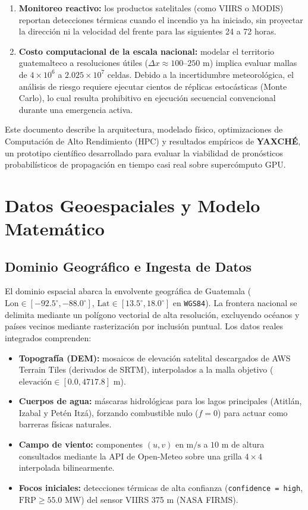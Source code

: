 \documentclass[twocolumn,10pt]{article}
\begin{document}
\begin{enumerate}
    \item \textbf{Monitoreo reactivo:} los productos satelitales (como VIIRS o MODIS) reportan detecciones térmicas cuando el incendio ya ha iniciado, sin proyectar la dirección ni la velocidad del frente para las siguientes 24 a 72 horas.
    \item \textbf{Costo computacional de la escala nacional:} modelar el territorio guatemalteco a resoluciones útiles ($\Delta x \approx 100$--$250\text{ m}$) implica evaluar mallas de $4\times 10^6$ a $2.025\times 10^7$ celdas. Debido a la incertidumbre meteorológica, el análisis de riesgo requiere ejecutar cientos de réplicas estocásticas (Monte Carlo), lo cual resulta prohibitivo en ejecución secuencial convencional durante una emergencia activa.
\end{enumerate}

Este documento describe la arquitectura, modelado físico, optimizaciones de Computación de Alto Rendimiento (HPC) y resultados empíricos de \textbf{YAXCHÉ}, un prototipo científico desarrollado para evaluar la viabilidad de pronósticos probabilísticos de propagación en tiempo casi real sobre supercómputo GPU.

\section{Datos Geoespaciales y Modelo Matemático}

\subsection{Dominio Geográfico e Ingesta de Datos}
El dominio espacial abarca la envolvente geográfica de Guatemala ($\text{Lon} \in [-92.5^\circ, -88.0^\circ]$, $\text{Lat} \in [13.5^\circ, 18.0^\circ]$ en \texttt{WGS84}). La frontera nacional se delimita mediante un polígono vectorial de alta resolución, excluyendo océanos y países vecinos mediante rasterización por inclusión puntual. Los datos reales integrados comprenden:

\begin{itemize}
    \item \textbf{Topografía (DEM):} mosaicos de elevación satelital descargados de AWS Terrain Tiles (derivados de SRTM), interpolados a la malla objetivo ($\text{elevación} \in [0.0, 4717.8]\text{ m}$).
    \item \textbf{Cuerpos de agua:} máscaras hidrológicas para los lagos principales (Atitlán, Izabal y Petén Itzá), forzando combustible nulo ($f = 0$) para actuar como barreras físicas naturales.
    \item \textbf{Campo de viento:} componentes $(u, v)$ en $\text{m/s}$ a $10\text{ m}$ de altura consultados mediante la API de Open-Meteo sobre una grilla $4\times 4$ interpolada bilinearmente.
    \item \textbf{Focos iniciales:} detecciones térmicas de alta confianza (\texttt{confidence = high}, $\text{FRP} \ge 55.0\text{ MW}$) del sensor VIIRS 375 m (NASA FIRMS).
\end{itemize}
\end{document}

